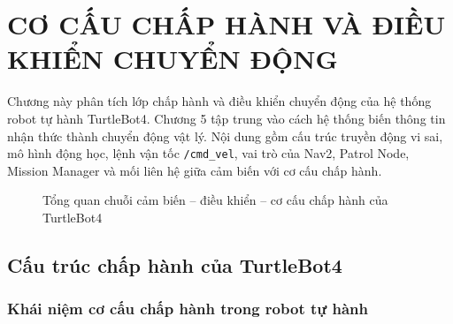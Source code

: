 \providecommand{\placeholderfigure}[3]{%
    \begin{figure}[H]
        \centering
        \fbox{%
            \parbox[c][4.0cm][c]{0.88\textwidth}{%
                \centering
                \textit{#1}%
            }%
        }
        \caption{#2}
        \label{#3}
    \end{figure}
}

\section{CƠ CẤU CHẤP HÀNH VÀ ĐIỀU KHIỂN CHUYỂN ĐỘNG}
\label{sec:actuators-motion-control}

Chương này phân tích lớp chấp hành và điều khiển chuyển động của hệ thống robot tự hành TurtleBot4. Chương 5 tập trung vào cách hệ thống biến thông tin nhận thức thành chuyển động vật lý. Nội dung gồm cấu trúc truyền động vi sai, mô hình động học, lệnh vận tốc \texttt{/cmd\_vel}, vai trò của Nav2, Patrol Node, Mission Manager và mối liên hệ giữa cảm biến với cơ cấu chấp hành.

\begin{figure}[H]
\centering
{}
\caption{Tổng quan chuỗi cảm biến -- điều khiển -- cơ cấu chấp hành của TurtleBot4}
\label{fig:actuator-control-overview}
\end{figure}

\subsection{Cấu trúc chấp hành của TurtleBot4}
\label{subsec:turtlebot4-actuator-structure}

\subsubsection{Khái niệm cơ cấu chấp hành trong robot tự hành}
\label{subsubsec:actuator-concept}


